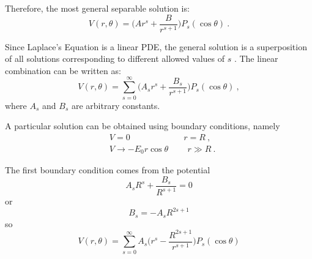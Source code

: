 \documentclass[a4paper]{jpconf}
\begin{document}
Therefore, the most general separable solution is:
\begin{equation}
V(r, \theta) = \bigg(A r^s + \frac{B}{r^{s+1}}\bigg) P_s (\cos \theta)~.
\end{equation}  

Since Laplace's Equation is a linear PDE, the general solution is a superposition of all solutions corresponding to different allowed values of $s$ \cite{griffiths-introElec}. The linear combination can be written as:
\begin{equation}
V(r, \theta) = \sum_{s=0}^{\infty} \bigg( A_s r^s + \frac{B_s}{r^{s+1}}\bigg) P_s (\cos \theta)~,
\end{equation} where $A_s$ and $B_s$ are arbitrary constants. \\ \par 

A particular solution can be obtained using boundary conditions, namely
\begin{subequations}
\begin{align}
&V = 0  \hspace{75pt} r = R~,\\ 
&V \to -E_0 r \cos \theta \hspace{27pt} r \gg R~.
\end{align}
\end{subequations}

The first boundary condition comes from the potential
\begin{equation}
A_s R^s + \frac{B_s}{R^{s+1}} = 0 
\end{equation}
or
\begin{equation}
B_s = -A_s R^{2s+1}
\end{equation}
so
\begin{equation}
V(r,\theta) = \sum_{s=0}^{\infty} A_s \bigg(r^s - \frac{R^{2s+1}}{r^{s+1}}\bigg) P_s (\cos \theta)
\end{equation}
\end{document}
